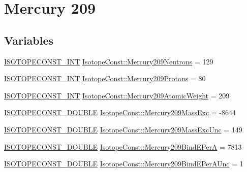 \hypertarget{group___isotope_const-_mercury-_hg209}{}\section{Mercury 209}
\label{group___isotope_const-_mercury-_hg209}
\subsection*{Variables}
\begin{DoxyCompactItemize}
\item 
\mbox{\hyperlink{group___isotope_const-_macros_ga5f18360b3e99483a35c32d789e62621c}{I\+S\+O\+T\+O\+P\+E\+C\+O\+N\+S\+T\+\_\+\+I\+NT}} \mbox{\hyperlink{group___isotope_const-_mercury-_hg209_gaa517d865ac0a24feb6d2668cad4e7d05}{Isotope\+Const\+::\+Mercury209\+Neutrons}} = 129
\item 
\mbox{\hyperlink{group___isotope_const-_macros_ga5f18360b3e99483a35c32d789e62621c}{I\+S\+O\+T\+O\+P\+E\+C\+O\+N\+S\+T\+\_\+\+I\+NT}} \mbox{\hyperlink{group___isotope_const-_mercury-_hg209_ga9dcb37fda732c6981193935d2e127127}{Isotope\+Const\+::\+Mercury209\+Protons}} = 80
\item 
\mbox{\hyperlink{group___isotope_const-_macros_ga5f18360b3e99483a35c32d789e62621c}{I\+S\+O\+T\+O\+P\+E\+C\+O\+N\+S\+T\+\_\+\+I\+NT}} \mbox{\hyperlink{group___isotope_const-_mercury-_hg209_ga2759cde1c7d4021583d5eea3d78fa6d4}{Isotope\+Const\+::\+Mercury209\+Atomic\+Weight}} = 209
\item 
\mbox{\hyperlink{group___isotope_const-_macros_ga8f45a7272ce02c0b4c65c44636ed719a}{I\+S\+O\+T\+O\+P\+E\+C\+O\+N\+S\+T\+\_\+\+D\+O\+U\+B\+LE}} \mbox{\hyperlink{group___isotope_const-_mercury-_hg209_ga2e471d847f81205b3a42b062b8ced1a2}{Isotope\+Const\+::\+Mercury209\+Mass\+Exc}} = -\/8644
\item 
\mbox{\hyperlink{group___isotope_const-_macros_ga8f45a7272ce02c0b4c65c44636ed719a}{I\+S\+O\+T\+O\+P\+E\+C\+O\+N\+S\+T\+\_\+\+D\+O\+U\+B\+LE}} \mbox{\hyperlink{group___isotope_const-_mercury-_hg209_gabac9f2379ab9ca4ffd5f752cbbbfce39}{Isotope\+Const\+::\+Mercury209\+Mass\+Exc\+Unc}} = 149
\item 
\mbox{\hyperlink{group___isotope_const-_macros_ga8f45a7272ce02c0b4c65c44636ed719a}{I\+S\+O\+T\+O\+P\+E\+C\+O\+N\+S\+T\+\_\+\+D\+O\+U\+B\+LE}} \mbox{\hyperlink{group___isotope_const-_mercury-_hg209_gab65d40aa9de348346799ced03ebb16e0}{Isotope\+Const\+::\+Mercury209\+Bind\+E\+PerA}} = 7813
\item 
\mbox{\hyperlink{group___isotope_const-_macros_ga8f45a7272ce02c0b4c65c44636ed719a}{I\+S\+O\+T\+O\+P\+E\+C\+O\+N\+S\+T\+\_\+\+D\+O\+U\+B\+LE}} \mbox{\hyperlink{group___isotope_const-_mercury-_hg209_ga6002990cac6f5c6ce6a0f7fb5b6be560}{Isotope\+Const\+::\+Mercury209\+Bind\+E\+Per\+A\+Unc}} = 1

\end{DoxyCompactItemize}
